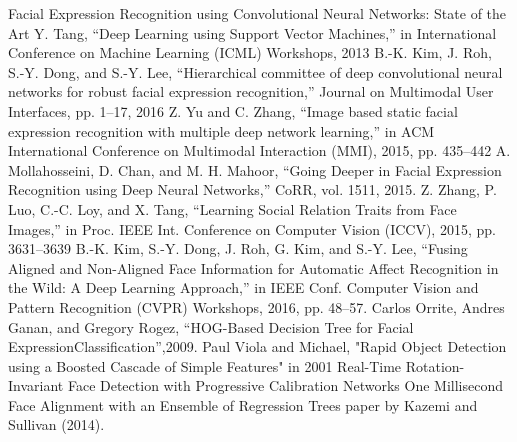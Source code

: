 \begin{enumerate}
 Facial Expression Recognition using Convolutional Neural Networks: State of the Art
Y. Tang, “Deep Learning using Support Vector Machines,” in International Conference on Machine Learning (ICML) Workshops, 2013
B.-K. Kim, J. Roh, S.-Y. Dong, and S.-Y. Lee, “Hierarchical committee
of deep convolutional neural networks for robust facial expression
recognition,” Journal on Multimodal User Interfaces, pp. 1–17, 2016
Z. Yu and C. Zhang, “Image based static facial expression recognition
with multiple deep network learning,” in ACM International Conference
on Multimodal Interaction (MMI), 2015, pp. 435–442
 A. Mollahosseini, D. Chan, and M. H. Mahoor, “Going Deeper in Facial
Expression Recognition using Deep Neural Networks,” CoRR, vol. 1511,
2015.
Z. Zhang, P. Luo, C.-C. Loy, and X. Tang, “Learning Social Relation
Traits from Face Images,” in Proc. IEEE Int. Conference on Computer
Vision (ICCV), 2015, pp. 3631–3639
 B.-K. Kim, S.-Y. Dong, J. Roh, G. Kim, and S.-Y. Lee, “Fusing Aligned
and Non-Aligned Face Information for Automatic Affect Recognition in
the Wild: A Deep Learning Approach,” in IEEE Conf. Computer Vision
and Pattern Recognition (CVPR) Workshops, 2016, pp. 48–57.
 Carlos Orrite, Andres Ganan, and Gregory Rogez, “HOG-Based Decision Tree for Facial ExpressionClassification”,2009.
 Paul Viola and Michael, "Rapid Object Detection using a Boosted Cascade of Simple Features" in 2001
 Real-Time Rotation-Invariant Face Detection with Progressive Calibration Networks
One Millisecond Face Alignment with an Ensemble of Regression Trees paper by Kazemi and Sullivan (2014).
\end{enumerate}
